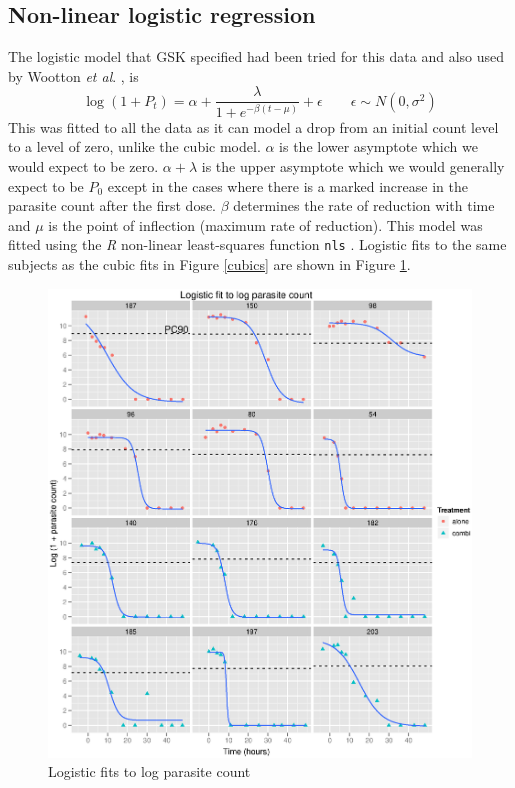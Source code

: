 \subsection{Non-linear logistic regression}
The logistic model that GSK specified had been tried for this data and also used by Wootton \textit{et al}. \cite{wootton}, is
$$\log(1+P_t)=\alpha+\frac{\lambda}{1+e^{-\beta(t-\mu)}}+\epsilon\quad\quad\epsilon\sim N(0,\sigma^2)$$
This was fitted to all the data as it can model a drop from an initial count level to a level of zero, unlike the cubic model. $\alpha$ is the lower asymptote which we would expect to be zero. $\alpha+\lambda$ is the upper asymptote which we would generally expect to be $P_0$ except in the cases where there is a marked increase in the parasite count after the first dose. $\beta$ determines the rate of reduction with time and $\mu$ is the point of inflection (maximum rate of reduction). This model was fitted using the \emph{R} non-linear least-squares function \texttt{nls} \cite{R}. Logistic fits to the same subjects as the cubic fits in Figure \ref{cubics} are shown in Figure \ref{logistics}.
\begin{figure}[h]
\includegraphics[width=150mm]{logistics.eps} 
\caption{Logistic fits to log parasite count}\label{logistics}
\end{figure}

